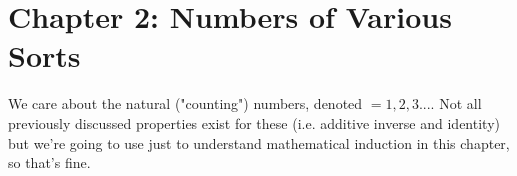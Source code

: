 \documentclass{article}
\begin{document}
\section{Chapter 2: Numbers of Various Sorts}

We care about the natural ("counting") numbers, denoted  $= {1,2,3 ... }$. Not all previously discussed properties exist for these (i.e. additive inverse and identity) but we're going to use  just to understand mathematical induction in this chapter, so that's fine.
\end{document}
